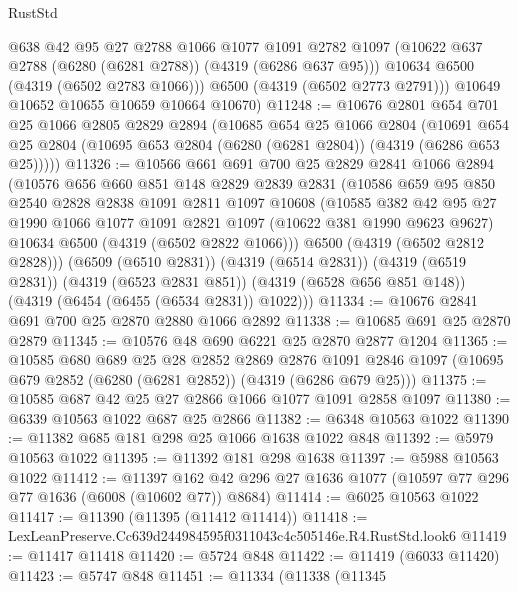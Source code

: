 \begin{lexlean}{RustStd}
\begin{coremodule}
          @638
          @42
          @95
          @27
          @2788
          @1066
          @1077
          @1091
          @2782
          @1097
          (@10622 @637 @2788 (@6280 (@6281 @2788)) (@4319 (@6286 @637 @95)))
          @10634
          @6500
          (@4319 (@6502 @2783 @1066)))
        @6500
        (@4319 (@6502 @2773 @2791)))
      @10649
      @10652
      @10655
      @10659
      @10664
      @10670)
@11248 := @10676
    @2801
    @654
    @701
    @25
    @1066
    @2805
    @2829
    @2894
    (@10685
      @654
      @25
      @1066
      @2804
      (@10691 @654 @25 @2804 (@10695 @653 @2804 (@6280 (@6281 @2804)) (@4319 (@6286 @653 @25)))))
@11326 := @10566
    @661
    @691
    @700
    @25
    @2829
    @2841
    @1066
    @2894
    (@10576
      @656
      @660
      @851
      @148
      @2829
      @2839
      @2831
      (@10586
        @659
        @95
        @850
        @2540
        @2828
        @2838
        @1091
        @2811
        @1097
        @10608
        (@10585
          @382
          @42
          @95
          @27
          @1990
          @1066
          @1077
          @1091
          @2821
          @1097
          (@10622 @381 @1990 @9623 @9627)
          @10634
          @6500
          (@4319 (@6502 @2822 @1066)))
        @6500
        (@4319 (@6502 @2812 @2828)))
      (@6509 (@6510 @2831))
      (@4319 (@6514 @2831))
      (@4319 (@6519 @2831))
      (@4319 (@6523 @2831 @851))
      (@4319 (@6528 @656 @851 @148))
      (@4319 (@6454 (@6455 (@6534 @2831)) @1022)))
@11334 := @10676 @2841 @691 @700 @25 @2870 @2880 @1066 @2892
@11338 := @10685 @691 @25 @2870 @2879
@11345 := @10576 @48 @690 @6221 @25 @2870 @2877 @1204
@11365 := @10585
    @680
    @689
    @25
    @28
    @2852
    @2869
    @2876
    @1091
    @2846
    @1097
    (@10695 @679 @2852 (@6280 (@6281 @2852)) (@4319 (@6286 @679 @25)))
@11375 := @10585 @687 @42 @25 @27 @2866 @1066 @1077 @1091 @2858 @1097
@11380 := @6339 @10563 @1022 @687 @25 @2866
@11382 := @6348 @10563 @1022
@11390 := @11382 @685 @181 @298 @25 @1066 @1638 @1022 @848
@11392 := @5979 @10563 @1022
@11395 := @11392 @181 @298 @1638
@11397 := @5988 @10563 @1022
@11412 := @11397
    @162
    @42
    @296
    @27
    @1636
    @1077
    (@10597 @77 @296 @77 @1636 (@6008 (@10602 @77)) @8684)
@11414 := @6025 @10563 @1022
@11417 := @11390 (@11395 (@11412 @11414))
@11418 := LexLeanPreserve.Cc639d244984595f0311043c4c505146e.R4.RustStd.look6
@11419 := @11417 @11418
@11420 := @5724 @848
@11422 := @11419 (@6033 @11420)
@11423 := @5747 @848
@11451 := @11334
    (@11338
      (@11345

\end{coremodule}
\end{lexlean}
